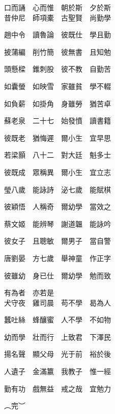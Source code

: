 \documentclass[a4paper,twocolumn]{article}
\begin{document}
\begin{Large}
口而誦　心而惟　朝於斯　夕於斯
\\

昔仲尼　師項橐　古聖賢　尚勤學

趙中令　讀魯論　彼既仕　學且勤

披蒲編　削竹簡　彼無書　且知勉

頭懸樑　錐刺股　彼不教　自勤苦

如囊螢　如映雪　家雖貧　學不輟

如負薪　如掛角　身雖勞　猶苦卓

蘇老泉　二十七　始發憤　讀書籍

彼既老　猶悔遲　爾小生　宜早思

若梁顥　八十二　對大廷　魁多士

彼既成　眾稱異　爾小生　宜立志

瑩八歲　能詠詩　泌七歲　能賦棋

彼穎悟　人稱奇　爾幼學　當效之

蔡文姬　能辨琴　謝道韞　能詠吟

彼女子　且聰敏　爾男子　當自警

唐劉晏　方七歲　舉神童　作正字

彼雖幼　身已仕　爾幼學　勉而致

有為者　亦若是
\\

犬守夜　雞司晨　苟不學　曷為人

蠶吐絲　蜂釀蜜　人不學　不如物

幼而學　壯而行　上致君　下澤民

揚名聲　顯父母　光于前　裕於後

人遺子　金滿籝　我教子　惟一經

勤有功　戲無益　戒之哉　宜勉力

︵完︶

\end{Large}
\end{document}
